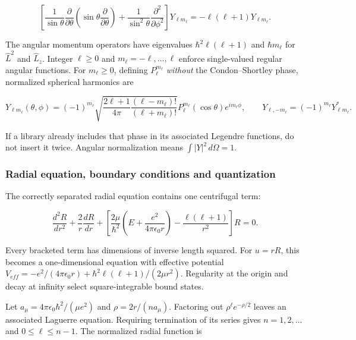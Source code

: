 \documentclass{article}
\begin{document}
\begin{equation}
\left[\frac{1}{\sin\theta}\frac{\partial}{\partial\theta}\left(\sin\theta\frac{\partial}{\partial\theta}\right)
+\frac{1}{\sin^2\theta}\frac{\partial^2}{\partial\phi^2}\right]Y_{\ell m_\ell}
=-\ell(\ell+1)Y_{\ell m_\ell}.
\label{hydrogen-angular}
\end{equation}

The angular momentum operators have eigenvalues $\hbar^2\ell(\ell+1)$ and $\hbar m_\ell$ for $\hat L^2$ and $\hat L_z$. Integer $\ell\geq0$ and $m_\ell=-\ell,\ldots,\ell$ enforce single-valued regular angular functions. For $m_\ell\geq0$, defining $P_\ell^{m_\ell}$ \emph{without} the Condon--Shortley phase, normalized spherical harmonics are

\begin{equation}
Y_{\ell m_\ell}(\theta,\phi)=(-1)^{m_\ell}
\sqrt{\frac{2\ell+1}{4\pi}\frac{(\ell-m_\ell)!}{(\ell+m_\ell)!}}
P_\ell^{m_\ell}(\cos\theta)e^{im_\ell\phi},\qquad
Y_{\ell,-m_\ell}=(-1)^{m_\ell}Y_{\ell m_\ell}^{*}.
\end{equation}

If a library already includes that phase in its associated Legendre functions, do not insert it twice. Angular normalization means $\int |Y|^2\,d\Omega=1$.

\subsubsection{Radial equation, boundary conditions and quantization}
The correctly separated radial equation contains one centrifugal term:

\begin{equation}
\frac{d^2R}{dr^2}+\frac{2}{r}\frac{dR}{dr}
+\left[\frac{2\mu}{\hbar^2}\left(E+\frac{e^2}{4\pi\epsilon_0r}\right)
-\frac{\ell(\ell+1)}{r^2}\right]R=0.
\label{hydrogen-radial}
\end{equation}

Every bracketed term has dimensions of inverse length squared. For $u=rR$, this becomes a one-dimensional equation with effective potential $V_{eff}=-e^2/(4\pi\epsilon_0r)+\hbar^2\ell(\ell+1)/(2\mu r^2)$. Regularity at the origin and decay at infinity select square-integrable bound states.

Let $a_\mu=4\pi\epsilon_0\hbar^2/(\mu e^2)$ and $\rho=2r/(na_\mu)$. Factoring out $\rho^\ell e^{-\rho/2}$ leaves an associated Laguerre equation. Requiring termination of its series gives $n=1,2,\ldots$ and $0\leq\ell\leq n-1$. The normalized radial function is
\end{document}
